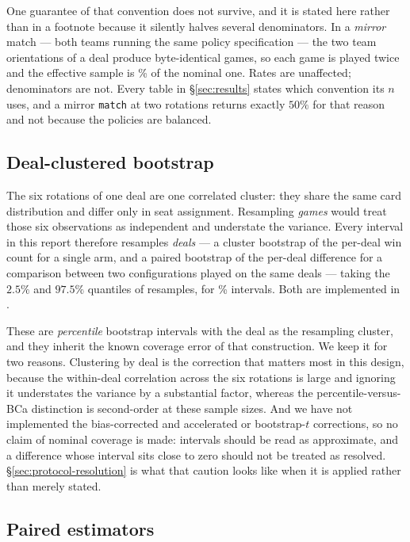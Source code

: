One guarantee of that convention does not survive, and it is stated here rather
than in a footnote because it silently halves several denominators. In a
\emph{mirror} match --- both teams running the same policy specification --- the
two team orientations of a deal produce byte-identical games, so each game is
played twice and the effective sample is \vsixMirrorDuplication{}\% of the
nominal one. Rates are unaffected; denominators are not. Every table in
\S\ref{sec:results} states which convention its $n$ uses, and a mirror
\texttt{match} at two rotations returns exactly $50\%$ for that reason and not
because the policies are balanced.

\subsection{Deal-clustered bootstrap}
\label{sec:protocol-ci}

The six rotations of one deal are one correlated cluster: they share the same
card distribution and differ only in seat assignment. Resampling \emph{games}
would treat those six observations as independent and understate the variance.
Every interval in this report therefore resamples \emph{deals} --- a cluster
bootstrap of the per-deal win count for a single arm, and a paired bootstrap of
the per-deal difference for a comparison between two configurations played on the
same deals --- taking the $2.5\%$ and $97.5\%$ quantiles of \vsixBootReps{}
resamples, for \vsixBootAlpha{}\% intervals. Both are implemented in
.

These are \emph{percentile} bootstrap intervals with the deal as the resampling
cluster, and they inherit the known coverage error of that construction. We keep
it for two reasons. Clustering by deal is the correction that matters most in
this design, because the within-deal correlation across the six rotations is
large and ignoring it understates the variance by a substantial factor, whereas
the percentile-versus-BCa distinction is second-order at these sample sizes. And
we have not implemented the bias-corrected and accelerated or bootstrap-$t$
corrections, so no claim of nominal coverage is made: intervals should be read as
approximate, and a difference whose interval sits close to zero should not be
treated as resolved. \S\ref{sec:protocol-resolution} is what that caution looks
like when it is applied rather than merely stated.

\subsection{Paired estimators}
\label{sec:protocol-paired}

